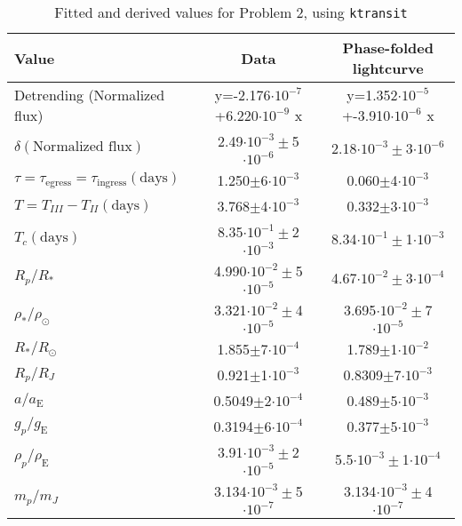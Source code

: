 \documentclass[10pt, preprint]{aastex}
\newcommand{\sol}{\ensuremath{\odot}}
\begin{document}
\begin{table}
\footnotesize
\centering
\begin{tabular}{lcc}
{\bf Value} & {\bf Data} & {\bf Phase-folded lightcurve} \\
\hline
Detrending (Normalized flux) & 
 y=-2.176$\cdot10^{-7}$+6.220$\cdot10^{-9}$ x &
 y=1.352$\cdot10^{-5}$+-3.910$\cdot10^{-6}$ x\\

$\delta (\text{Normalized flux})$ &
 2.49$\cdot10^{-3}\pm$5$\cdot10^{-6}$& 
 2.18$\cdot10^{-3}\pm$3$\cdot10^{-6}$\\

$\tau=\tau_\text{egress}=\tau_\text{ingress} (\text{days})$ & 
1.250$\pm$6$\cdot10^{-3}$&
0.060$\pm$4$\cdot10^{-3}$ \\

$T=T_{III}-T_{II} (\text{days})$ & 3.768$\pm$4$\cdot10^{-3}$&
  0.332$\pm$3$\cdot10^{-3}$\\

$T_c (\text{days})$ &  8.35$\cdot10^{-1}\pm$2$\cdot10^{-3}$ &
8.34$\cdot10^{-1}\pm$1$\cdot10^{-3}$ \\
$R_p/R_*$ & 4.990$\cdot10^{-2}\pm$5$\cdot10^{-5}$
& 4.67$\cdot10^{-2}\pm$3$\cdot10^{-4}$\\

$\rho_*/\rho_\sol$ & 3.321$\cdot10^{-2}\pm$4$\cdot10^{-5}$& 
3.695$\cdot10^{-2}\pm$7$\cdot10^{-5}$\\

$R_*/R_\sol$ & 1.855$\pm$7$\cdot10^{-4}$& 
1.789$\pm$1$\cdot10^{-2}$ \\

$R_p/R_J$ & 0.921$\pm$1$\cdot10^{-3}$
&0.8309$\pm$7$\cdot10^{-3}$ \\

$a/a_\text{E}$ & 0.5049$\pm$2$\cdot10^{-4}$ & 
0.489$\pm$5$\cdot10^{-3}$\\

$g_p/g_\text{E}$ & 0.3194$\pm$6$\cdot10^{-4}$&
0.377$\pm$5$\cdot10^{-3}$ \\

$\rho_p/\rho_\text{E}$ & 3.91$\cdot10^{-3}\pm$2$\cdot10^{-5}$&
5.5$\cdot10^{-3}\pm$1$\cdot10^{-4}$ \\

$m_p/m_J$ & 3.134$\cdot10^{-3}\pm$5$\cdot10^{-7}$&
3.134$\cdot10^{-3}\pm$4$\cdot10^{-7}$ \\

\end{tabular}
\caption{Fitted and derived values for Problem 2, using \protect \verb|ktransit| \label{prob2}}
\end{table}
\end{document}

